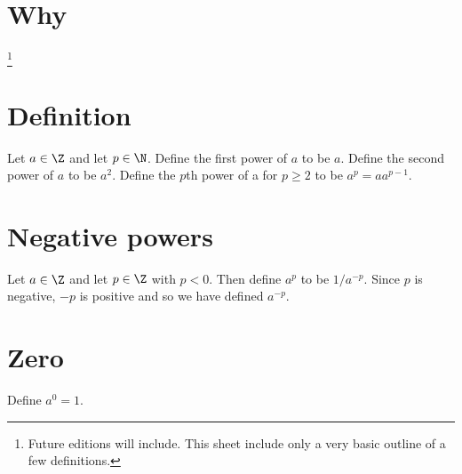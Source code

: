 

\section*{Why}
\footnote{Future editions will include. This sheet include only a very basic outline of a few definitions.}
\section*{Definition}

Let $a \in \Z $ and let $p \in \N  $.
Define the first power of $a$ to be $a$.
Define the second power of $a$ to be $a^2$.
Define the $p$th power of a for $p \geq 2$ to be $a^p = aa^{p-1}$.

\section*{Negative powers}

Let $a \in \Z $ and let $p \in \Z $ with $p < 0$.
Then define $a^{p}$ to be $1/a^{-p}$.
Since $p$ is negative, $-p$ is positive and so we have defined $a^{-p}$.

\section*{Zero}

Define $a^0 = 1$.

\blankpage